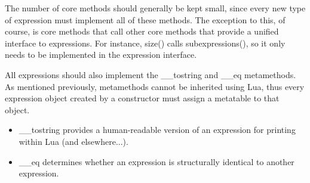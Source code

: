 \documentclass{article}
\begin{document}
The number of core methods should generally be kept small, since every new type of expression must implement all of these methods. The exception to this, of course, is core methods that call other core methods that provide a unified interface to expressions. For instance, {\ttfamily size()} calls {\ttfamily subexpressions()}, so it only needs to be implemented in the expression interface.

All expressions should also implement the {\ttfamily \_\_tostring} and {\ttfamily \_\_eq} metamethods. As mentioned previously, metamethods cannot be inherited using Lua, thus every expression object created by a constructor must assign a metatable to that object.

\begin{itemize}
    \item {\ttfamily \_\_tostring} provides a human-readable version of an expression for printing within Lua (and elsewhere...). 
    
    \item {\ttfamily \_\_eq} determines whether an expression is structurally identical to another expression.
\end{itemize}
\end{document}
